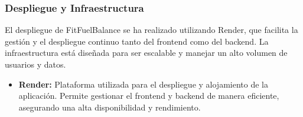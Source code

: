\subsubsection{Despliegue y Infraestructura}

El despliegue de FitFuelBalance se ha realizado utilizando Render, que facilita la gestión y el despliegue continuo tanto del frontend como del backend. La infraestructura está diseñada para ser escalable y manejar un alto volumen de usuarios y datos.

\begin{itemize}
    \item \textbf{Render:} Plataforma utilizada para el despliegue y alojamiento de la aplicación. Permite gestionar el frontend y backend de manera eficiente, asegurando una alta disponibilidad y rendimiento.
\end{itemize}